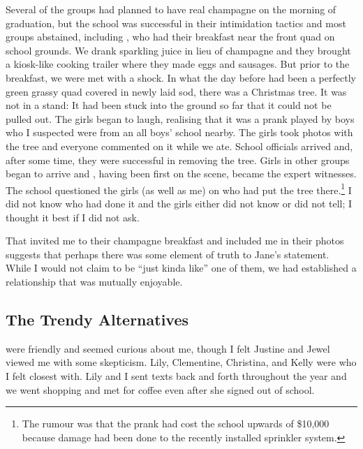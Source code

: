 Several of the groups had planned to have real champagne on the morning of graduation, but the school was successful in their intimidation tactics and most groups abstained, including , who had their breakfast near the front quad on school grounds. We drank sparkling juice in lieu of champagne and they brought a kiosk-like cooking trailer where they made eggs and sausages. But prior to the breakfast, we were met with a shock. In what the day before had been a perfectly green grassy quad covered in newly laid sod, there was a Christmas tree. It was not in a stand: It had been stuck into the ground so far that it could not be pulled out. The girls began to laugh, realising that it was a prank played by boys who I suspected were from an all boys' school nearby. The girls took photos with the tree and everyone commented on it while we ate. School officials arrived and, after some time, they were successful in removing the tree. Girls in other groups began to arrive and , having been first on the scene, became the expert witnesses. The school questioned the girls (as well as me) on who had put the tree there.\footnote{The rumour was that the prank had cost the school upwards of \$10,000 because damage had been done to the recently installed sprinkler system.}  I did not know who had done it and the girls either did not know or did not tell; I thought it best if I did not ask.

That  invited me to their champagne breakfast and included me in their photos suggests that perhaps there was some element of truth to Jane's statement. While I would not claim to be ``just kinda like'' one of them, we had established a relationship that was mutually enjoyable.

\subsection{The Trendy Alternatives}
\largerpage
{} were friendly and seemed curious about me, though I felt Justine and Jewel viewed me with some skepticism. Lily, Clementine, Christina, and Kelly were  who I felt closest with. Lily and I sent texts back and forth throughout the year and we went shopping and met for coffee even after she signed out of school.   

